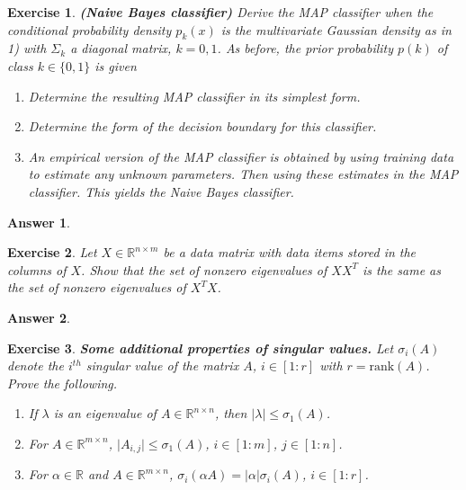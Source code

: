 \documentclass[12pt]{article}
\theoremstyle{colon}
\newtheorem{exercise}{Exercise}
\newtheorem*{answer}{Answer}
\begin{document}
\begin{exercise}
  \textbf{(Naive Bayes classifier)} Derive the MAP classifier when the conditional probability density $p_k(x)$ is the multivariate Gaussian density as in 1) with $\Sigma_k$ a diagonal matrix, $k = 0, 1$. As before, the prior probability $p(k)$ of class $k \in \{0, 1\}$ is given

  \begin{enumerate}[label=\alph*)]
    \item Determine the resulting MAP classifier in its simplest form.
    \item Determine the form of the decision boundary for this classifier.
    \item An empirical version of the MAP classifier is obtained by using training data to estimate any unknown parameters. Then using these estimates in the MAP classifier. This yields the Naive Bayes classifier.
  \end{enumerate}
\end{exercise}

\begin{answer}
\end{answer}

\clearpage

\begin{exercise}
  Let $X \in \mathbb{R}^{n \times m}$ be a data matrix with data items stored in the columns of $X$. Show that the set of nonzero eigenvalues of $X X^T$ is the same as the set of nonzero eigenvalues of $X^T X$.
\end{exercise}

\begin{answer}
\end{answer}

\clearpage

\begin{exercise}
  \textbf{Some additional properties of singular values.} Let $\sigma_i(A)$ denote the $i^{th}$ singular value of the matrix $A$, $i \in [1:r]$ with $r = \text{rank}(A)$. Prove the following.

  \begin{enumerate}[label=\alph*)]
    \item If $\lambda$ is an eigenvalue of $A \in \mathbb{R}^{n \times n}$, then $\lvert \lambda \rvert \leq \sigma_1(A)$.
    \item For $A \in \mathbb{R}^{m \times n}$, $\lvert A_{i,j} \rvert \leq \sigma_1(A)$, $i \in [1:m]$, $ j \in [1:n]$.
    \item For $\alpha \in \mathbb{R}$ and $A \in \mathbb{R}^{m \times n}$, $\sigma_i(\alpha A) = \lvert \alpha \rvert \sigma_i(A)$, $i \in [1:r]$.
  \end{enumerate}
\end{exercise}
\end{document}
